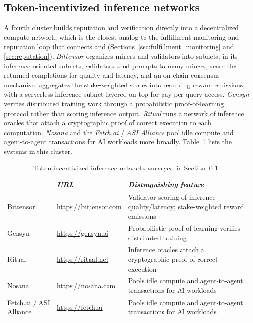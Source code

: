 \subsection{Token-incentivized inference networks}
\label{sec:sota_decentralized}

A fourth cluster builds reputation and verification directly into a
decentralized compute network, which is the closest analog to the
fulfillment-monitoring and reputation loop that connects \NoesisServer{}
and \NoesisMarket{} (Sections~\ref{sec:fulfillment_monitoring} and
\ref{sec:reputation}).
\emph{Bittensor} organizes miners and validators into subnets; in its
inference-oriented subnets, validators send prompts to many miners, score
the returned completions for quality and latency, and an on-chain
consensus mechanism aggregates the stake-weighted scores into recurring
reward emissions, with a serverless-inference subnet layered on top for
pay-per-query access. \emph{Gensyn} verifies distributed training work
through a probabilistic proof-of-learning protocol rather than scoring
inference output. \emph{Ritual} runs a network of inference oracles that
attach a cryptographic proof of correct execution to each computation.
\emph{Nosana} and the \emph{\href{https://fetch.ai}{Fetch.ai}} / \emph{ASI Alliance} pool idle
compute and agent-to-agent transactions for AI workloads more broadly.
Table~\ref{tab:sota_decentralized_companies} lists the systems in this
cluster.

\begin{samepage}
  \begin{table}[H]
    \centering
    \footnotesize
    \begin{tabular}{l|l|p{6.2cm}|}
                             & \emph{URL} & \emph{Distinguishing feature} \\
      \hline
      Bittensor               & \url{https://bittensor.com} & Validator scoring of inference quality/latency; stake-weighted reward emissions \\
      \hline
      Gensyn                  & \url{https://gensyn.ai} & Probabilistic proof-of-learning verifies distributed training \\
      \hline
      Ritual                  & \url{https://ritual.net} & Inference oracles attach a cryptographic proof of correct execution \\
      \hline
      Nosana                  & \url{https://nosana.com} & Pools idle compute and agent-to-agent transactions for AI workloads \\
      \hline
      \href{https://fetch.ai}{Fetch.ai} / ASI Alliance  & \url{https://fetch.ai} & Pools idle compute and agent-to-agent transactions for AI workloads \\
      \hline
    \end{tabular}
    \caption{Token-incentivized inference networks surveyed in
      Section~\ref{sec:sota_decentralized}.}
    \label{tab:sota_decentralized_companies}
  \end{table}
\end{samepage}

